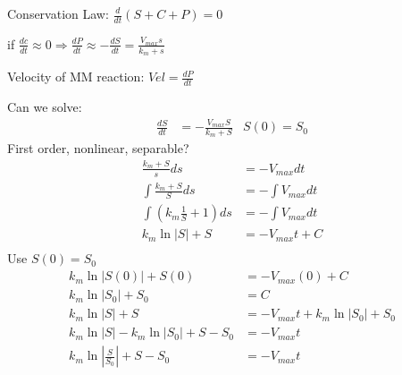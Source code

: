 \documentclass[
	date={October 28{,} 2024},
	month={10},
	day={28}
]{math486notes}
\begin{document}
Conservation Law: $\frac{d}{dt}(S + C + P) = 0$

if $\frac{dc}{dt} \approx 0 \Rightarrow \frac{dP}{dt} \approx -\frac{dS}{dt} = \frac{V_{max}s}{k_{m} + s}$

Velocity of MM reaction: $Vel = \frac{dP}{dt}$

Can we solve:
\begin{equation*}
\begin{aligned}
	\frac{dS}{dt} &= -\frac{V_{max}S}{k_{m} + S} & S(0) = S_{0}
\end{aligned}
\end{equation*}
First order, nonlinear, separable?
\begin{equation*}
\begin{aligned}
	\frac{k_{m} + S}{s}ds &= -V_{max}dt\\
	\int \frac{k_{m} + S}{S}ds &= -\int V_{max}dt\\
	\int \left( k_{m}\frac{1}{S} + 1 \right) ds &= -\int V_{max}dt\\
	k_{m}\ln|S| + S &= -V_{max}t + C\\
\end{aligned}
\end{equation*}
Use $S(0) = S_{0}$
\begin{equation*}
\begin{aligned}
	k_{m}\ln| S(0) | + S(0) &= -V_{max}(0) + C\\
	k_{m}\ln| S_{0} | + S_{0} &= C\\
	k_{m}\ln|S| + S &= -V_{max}t + k_{m}\ln| S_{0} | + S_{0}\\
	k_{m}\ln|S| - k_{m}\ln| S_{0} | + S - S_{0} &= -V_{max}t\\
	k_{m}\ln|\frac{S}{S_{0}}| + S - S_{0} &= -V_{max}t\\%
\end{aligned}
\end{equation*}
\end{document}
